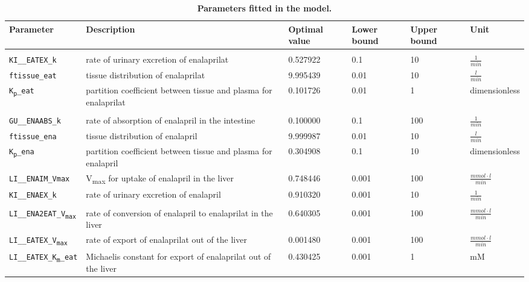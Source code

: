 \begin{table}[h!]
\centering
\small
\caption[Fitted model parameters]{\textbf{Parameters fitted in the model.}}
\label{tab:Parameter_Fitting}
\vspace{0.1cm}
\begin{tabular}{L{0.17\textwidth} L{0.350\textwidth} P{0.07\textwidth} P{0.05\textwidth} P{0.05\textwidth} P{0.105\textwidth}}
 \toprule
\textbf{Parameter} & \textbf{Description} & \textbf{Optimal value} & \textbf{Lower bound} & \textbf{Upper bound}& \textbf{Unit}\\
\hline
{}
\\
\hline
\texttt{KI\_\_EATEX\_k} & rate of urinary excretion of enalaprilat & 0.527922 & 0.1 & 10 & $\frac{1}{min}$ \newline \\
\texttt{ftissue\_eat} & tissue distribution of enalaprilat & 9.995439 & 0.01 & 10  & $\frac{l}{min}$ \newline \\
\texttt{K\textsubscript{p}\_eat} & partition coefficient between tissue and plasma for enalaprilat & 0.101726 & 0.01 & 1  & dimensionless \newline \\
\hline
{}
\\
\hline
\texttt{GU\_\_ENAABS\_k} & rate of absorption of enalapril in the intestine & 0.100000 & 0.1 & 100 & $\frac{1}{min}$ \\
\texttt{ftissue\_ena} & tissue distribution of enalapril & 9.999987 & 0.01 & 10 & $\frac{l}{min}$ \\
\texttt{K\textsubscript{p}\_ena} & partition coefficient between tissue and plasma for enalapril & 0.304908 & 0.1 & 10 & dimensionless \\
\texttt{LI\_\_ENAIM\_Vmax} & V\textsubscript{max} for uptake of enalapril in the liver & 0.748446 & 0.001 & 100 & $\frac{mmol\cdot l}{min}$ \\
\texttt{KI\_\_ENAEX\_k} & rate of urinary excretion of enalapril & 0.910320 & 0.001 & 10 & $\frac{1}{min}$ \\
\hline
{}
\\
\hline
\texttt{LI\_\_ENA2EAT\_V\textsubscript{max}} & rate of conversion of enalapril to enalaprilat in the liver & 0.640305 & 0.001 & 100 & $\frac{mmol\cdot l}{min}$ \\
\texttt{LI\_\_EATEX\_V\textsubscript{max}} & rate of export of enalaprilat out of the liver & 0.001480 & 0.001 & 100 & $\frac{mmol\cdot l}{min}$ \\
\texttt{LI\_\_EATEX\_K\textsubscript{m}\_eat} & Michaelis constant for export of enalaprilat out of the liver & 0.430425 & 0.001 & 1 & mM \\
 \bottomrule
\end{tabular}
\end{table}

